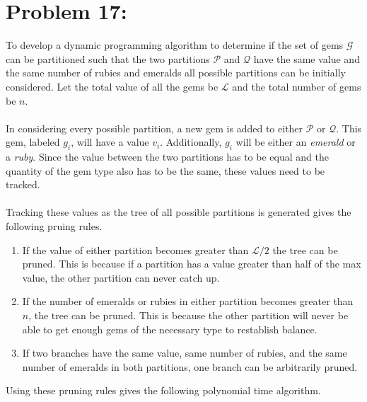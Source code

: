 \documentclass[12pt]{article}
\begin{document}
\section*{Problem 17: }
To develop a dynamic programming algorithm to determine if the
set of gems $\mathcal{G}$ can be partitioned such that the two
partitions $\mathcal{P}$ and $\mathcal{Q}$ have the same value
and the same number of rubies and emeralds all possible partitions
can be initially considered.  Let the total value of all the gems
be $\mathcal{L}$ and the total number of gems be $n$.\\\\
In considering every possible partition, a new gem is added to 
either $\mathcal{P}$ or $\mathcal{Q}$.  This gem, labeled
$g_i$, will have a value $v_i$. Additionally, $g_i$ will be 
either an \textit{emerald} or a \textit{ruby}.  Since the value 
between the two partitions has to be equal and the quantity of the
gem type also has to be the same, these values need to be tracked.\\\\
Tracking these values as the tree of all possible partitions is
generated gives the following pruing rules.
\begin{enumerate}
    \item If the value of either partition becomes greater than $\mathcal{L}/2$
          the tree can be pruned.  This is because if a partition has a value
          greater than half of the max value, the other partition can never
          catch up.
    \item If the number of emeralds or rubies in either partition becomes
          greater than $n$, the tree can be pruned. This is because the other
          partition will never be able to get enough gems of the necessary
          type to restablish balance.
    \item If two branches have the same value, same number of rubies, and
          the same number of emeralds in both partitions, one branch can be
          arbitrarily pruned.
\end{enumerate}
Using these pruning rules gives the following polynomial time algorithm.   
\end{document}
